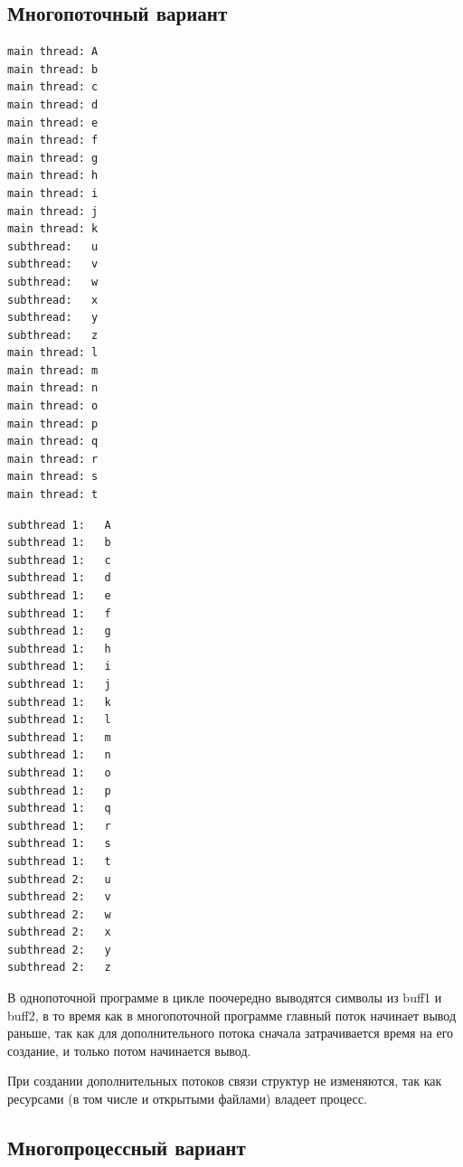 \documentclass[a4paper,14pt]{extarticle}
\begin{document}
\subsection{Многопоточный вариант}



\begin{lstlisting}[caption={\text{Вывод программы}}]
main thread: A
main thread: b
main thread: c
main thread: d
main thread: e
main thread: f
main thread: g
main thread: h
main thread: i
main thread: j
main thread: k
subthread:   u
subthread:   v
subthread:   w
subthread:   x
subthread:   y
subthread:   z
main thread: l
main thread: m
main thread: n
main thread: o
main thread: p
main thread: q
main thread: r
main thread: s
main thread: t
\end{lstlisting}



\begin{lstlisting}[caption={\text{Вывод программы}}]
subthread 1:   A
subthread 1:   b
subthread 1:   c
subthread 1:   d
subthread 1:   e
subthread 1:   f
subthread 1:   g
subthread 1:   h
subthread 1:   i
subthread 1:   j
subthread 1:   k
subthread 1:   l
subthread 1:   m
subthread 1:   n
subthread 1:   o
subthread 1:   p
subthread 1:   q
subthread 1:   r
subthread 1:   s
subthread 1:   t
subthread 2:   u
subthread 2:   v
subthread 2:   w
subthread 2:   x
subthread 2:   y
subthread 2:   z
\end{lstlisting}

В однопоточной программе в цикле поочередно выводятся символы из buff1 и buff2, в то время как в многопоточной программе главный поток начинает вывод раньше, так как для дополнительного потока сначала затрачивается время на его создание, и только потом начинается вывод.

При создании дополнительных потоков связи структур не изменяются, так как ресурсами (в том числе и открытыми файлами) владеет процесс.

\subsection{Многопроцессный вариант}


\end{document}
